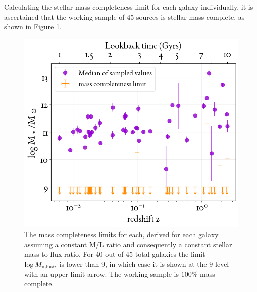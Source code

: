 Calculating the stellar mass completeness limit for each galaxy individually, it is ascertained that the working sample of 45 sources is stellar mass complete, as shown in Figure \ref{fig:MassCompl}.
\begin{figure}[htbp]
    \centering
    \includegraphics[width=\linewidth]{figures/ResultPlots/Mass_Compl.png}
    \caption{The mass completeness limits for each, derived for each galaxy assuming a constant M/L ratio and consequently a constant stellar mass-to-flux ratio. For 40 out of 45 total galaxies the limit $\log M_{\star, \mbox{\tiny{limit}}}$ is lower than 9, in which case it is shown at the $9$-level with an upper limit arrow. The working sample is $100\%$ mass complete.}
    \label{fig:MassCompl}
\end{figure}

